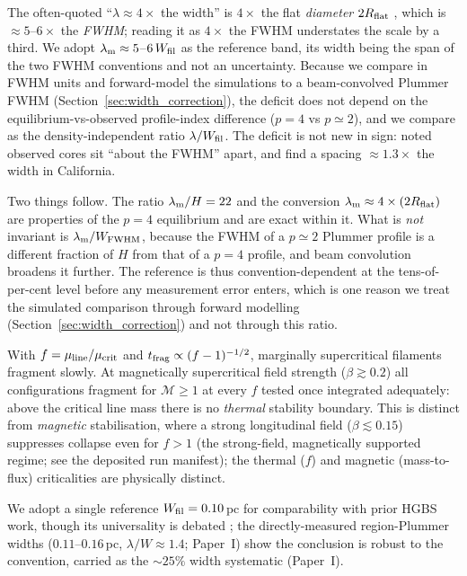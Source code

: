\documentclass[usenatbib,twoside,twocolumn]{mnras}
\begin{document}
The often-quoted ``$\lambda\approx4\times$ the width'' is $4\times$ the flat \emph{diameter} $2R_{\rm flat}$ \citep{Inutsuka1992}, which is $\approx5$--$6\times$ the \emph{FWHM}; reading it as $4\times$ the FWHM understates the scale by a third. We adopt $\lambda_{\rm m}\approx5$--$6\,W_{\rm fil}$ as the reference band, its width being the span of the two FWHM conventions and not an uncertainty. Because we compare in FWHM units and forward-model the simulations to a beam-convolved Plummer FWHM (Section~\ref{sec:width_correction}), the deficit does not depend on the equilibrium-vs-observed profile-index difference ($p=4$ vs $p\simeq2$), and we compare as the density-independent ratio $\lambda/W_{\rm fil}$. The deficit is not new in sign: \citet{Fischera2012} noted observed cores sit ``about the FWHM'' apart, and \citet{Zhang2023cal} find a spacing $\approx1.3\times$ the width in California.



Two things follow. The ratio $\lambda_{\rm m}/H=22$ and the conversion $\lambda_{\rm m}\approx4\times(2R_{\rm flat})$ are properties of the $p=4$ equilibrium and are exact within it. What is \emph{not} invariant is $\lambda_{\rm m}/W_{\rm FWHM}$, because the FWHM of a $p\simeq2$ Plummer profile is a different fraction of $H$ from that of a $p=4$ profile, and beam convolution broadens it further. The reference is thus convention-dependent at the tens-of-per-cent level before any measurement error enters, which is one reason we treat the simulated comparison through forward modelling (Section~\ref{sec:width_correction}) and not through this ratio.

With $f=\mu_{\rm line}/\mu_{\rm crit}$ and $t_{\rm frag}\propto(f-1)^{-1/2}$, marginally supercritical filaments fragment slowly. At magnetically supercritical field strength ($\beta\gtrsim0.2$) all configurations fragment for $\mathcal{M}\geq1$ at every $f$ tested once integrated adequately: above the critical line mass there is no \emph{thermal} stability boundary. This is distinct from \emph{magnetic} stabilisation, where a strong longitudinal field ($\beta\lesssim0.15$) suppresses collapse even for $f>1$ (the strong-field, magnetically supported regime; see the deposited run manifest); the thermal ($f$) and magnetic (mass-to-flux) criticalities are physically distinct.

We adopt a single reference $W_{\rm fil}=0.10$\,pc for comparability with prior HGBS work, though its universality is debated \citep{Panopoulou2017,Panopoulou2022}; the directly-measured region-Plummer widths ($0.11$--$0.16$\,pc, $\lambda/W\approx1.4$; Paper~I) show the conclusion is robust to the convention, carried as the $\sim25\%$ width systematic (Paper~I).
\end{document}
